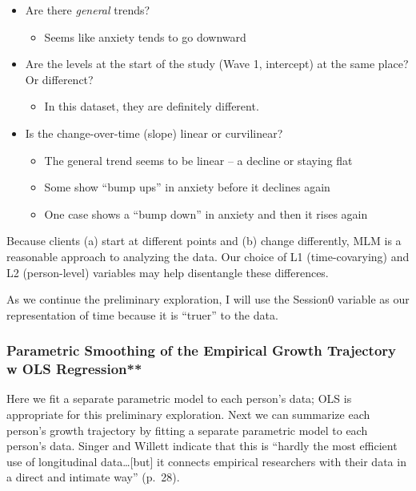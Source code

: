 \documentclass[
  11pt,
]{book}
\providecommand{\tightlist}{%
  \setlength{\itemsep}{0pt}\setlength{\parskip}{0pt}}
\begin{document}
\begin{itemize}
\tightlist
\item
  Are there \emph{general} trends?

  \begin{itemize}
  \tightlist
  \item
    Seems like anxiety tends to go downward
  \end{itemize}
\item
  Are the levels at the start of the study (Wave 1, intercept) at the same place? Or differenct?

  \begin{itemize}
  \tightlist
  \item
    In this dataset, they are definitely different.
  \end{itemize}
\item
  Is the change-over-time (slope) linear or curvilinear?

  \begin{itemize}
  \tightlist
  \item
    The general trend seems to be linear -- a decline or staying flat
  \item
    Some show ``bump ups'' in anxiety before it declines again
  \item
    One case shows a ``bump down'' in anxiety and then it rises again
  \end{itemize}
\end{itemize}

Because clients (a) start at different points and (b) change differently, MLM is a reasonable approach to analyzing the data. Our choice of L1 (time-covarying) and L2 (person-level) variables may help disentangle these differences.

As we continue the preliminary exploration, I will use the Session0 variable as our representation of time because it is ``truer'' to the data.

\hypertarget{parametric-smoothing-of-the-empirical-growth-trajectory-w-ols-regression}{%
\subsubsection{Parametric Smoothing of the Empirical Growth Trajectory w OLS Regression**}\label{parametric-smoothing-of-the-empirical-growth-trajectory-w-ols-regression}}

Here we fit a separate parametric model to each person's data; OLS is appropriate for this preliminary exploration. Next we can summarize each person's growth trajectory by fitting a separate parametric model to each person's data. Singer and Willett \citeyearpar{singer_applied_2003} indicate that this is ``hardly the most efficient use of longitudinal data\ldots{[}but{]} it connects empirical researchers with their data in a direct and intimate way'' (p.~28).
\end{document}
